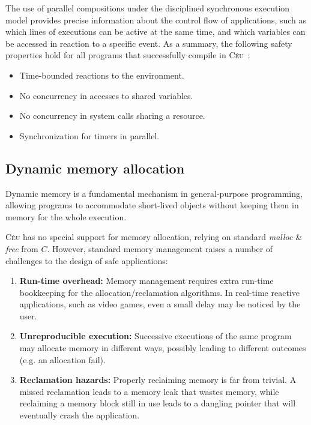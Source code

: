 \documentclass[pdftex,12pt,a4paper]{article}
\newcommand{\CEU}{\textsc{C\'{e}u}\xspace}
\begin{document}
The use of parallel compositions under the disciplined synchronous execution 
model provides precise information about the control flow of applications, such 
as which lines of executions can be active at the same time, and which 
variables can be accessed in reaction to a specific event.
%
As a summary, the following safety properties hold for all programs that 
successfully compile in \CEU~\cite{ceu.sensys13}:
%
\begin{itemize}
\item Time-bounded reactions to the environment.
\item No concurrency in accesses to shared variables.
\item No concurrency in system calls sharing a resource.
\item Synchronization for timers in parallel.
\end{itemize}

\subsection{Dynamic memory allocation}

Dynamic memory is a fundamental mechanism in general-purpose programming, 
allowing programs to accommodate short-lived objects without keeping them in 
memory for the whole execution.

\CEU has no special support for memory allocation, relying on standard 
\emph{malloc} \& \emph{free} from $C$.
%
However, standard memory management raises a number of challenges to the design 
of safe applications:

\begin{enumerate}
\item \textbf{Run-time overhead:}
    Memory management requires extra run-time bookkeeping for the 
    allocation/reclamation algorithms.
    In real-time reactive applications, such as video games, even a small delay 
    may be noticed by the user.
\item \textbf{Unreproducible execution:}
    Successive executions of the same program may allocate memory in different 
    ways, possibly leading to different outcomes (e.g. an allocation fail).
\item \textbf{Reclamation hazards:}
    Properly reclaiming memory is far from trivial.
    A missed reclamation leads to a memory leak that wastes memory, while 
    reclaiming a memory block still in use leads to a dangling pointer that 
will eventually crash the application.
\end{enumerate}
\end{document}
